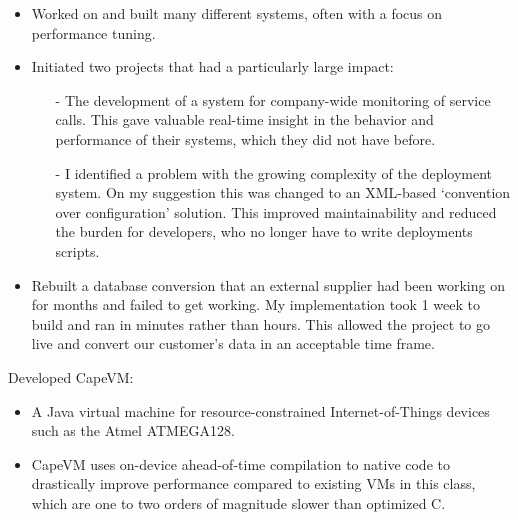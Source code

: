 \documentclass[10pt,a4paper]{altacv}
\begin{document}
\begin{itemize}
	\item\small{Worked on and built many different systems, often with a focus on performance tuning.}
	\item\small{Initiated two projects that had a particularly large impact:
	\begin{itemize}
		\item[-]\small{The development of a system for company-wide monitoring of service calls. This gave valuable real-time insight in the behavior and performance of their systems, which they did not have before.}
		\item[-]\small{I identified a problem with the growing complexity of the deployment system. On my suggestion this was changed to an XML-based ‘convention over configuration' solution. This improved maintainability and reduced the burden for developers, who no longer have to write deployments scripts.}
	\end{itemize}
	}
	\item\small{Rebuilt a database conversion that an external supplier had been working on for months and failed to get working. My implementation took 1 week to build and ran in minutes rather than hours. This allowed the project to go live and convert our customer's data in an acceptable time frame.}
\end{itemize}

\medskip
\medskip

\begin{comment}
\cvevent{Postdoctoral Researcher}{Academia Sinica}{Mar 2020 -- May 2021}{Taipei, Taiwan}
Research on disinformation.
\cvtag{Golang}
\cvtag{HTML}
\cvtag{CSS}
\cvevent{Postdoctoral Researcher}{National Taiwan University}{Feb 2019 -- Aug 2019}{Taipei, Taiwan}
Blockchain

\medskip
\medskip
\end{comment}


Developed CapeVM:
\begin{itemize}
    \item\small{A Java virtual machine for resource-constrained Internet-of-Things devices such as the Atmel ATMEGA128.}
    \item\small{CapeVM uses on-device ahead-of-time compilation to native code to drastically improve performance compared to existing VMs in this class, which are one to two orders of magnitude slower than optimized C.}
\end{itemize}
\end{document}
